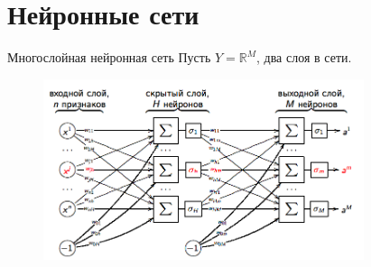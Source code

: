 \documentclass[10pt]{beamer}
\begin{document}
\section{Нейронные сети}

\begin{frame}{Многослойная нейронная сеть}
	Пусть $Y = \mathbb{R}^M$, два слоя в сети.\\
	
	\begin{figure}[htbp]
	  \includegraphics[height=150pt, keepaspectratio = true]{images/neural_network}   
	\end{figure}
\end{frame}
\end{document}
